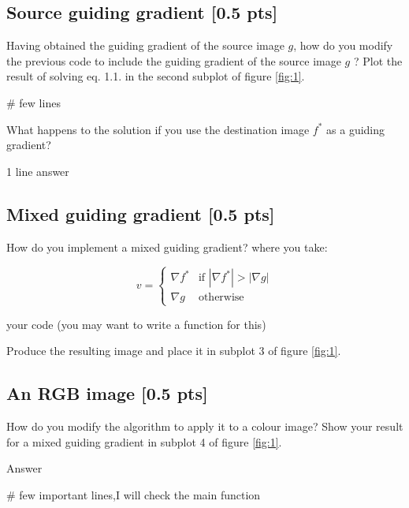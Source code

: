 \documentclass[paper=a4, fontsize=12pt]{scrartcl} %
\numberwithin{equation}{section}       %
\numberwithin{figure}{section}         %
\numberwithin{table}{section}          %
\begin{document}
\subsection{Source guiding gradient [0.5 pts]}
Having obtained the guiding gradient of the source image $g$, how do you modify the previous code to include the guiding gradient of the source image $g$ ? Plot the result  of solving eq. 1.1. in the second subplot of figure \ref{fig:1}.

 \begin{tcolorbox}
\begin{python}
# few lines
\end{python}
 \end{tcolorbox}
 
 What happens to the solution if you use the destination image $f^*$ as a  guiding gradient?
  \begin{tcolorbox}
1 line answer
 \end{tcolorbox}
 
 
 
 \subsection{Mixed guiding gradient [0.5 pts]}
How do you implement a mixed guiding gradient? where you take:

\begin{equation}
v=
\begin{cases}
\nabla f^* & \text{if } |\nabla f^*|>|\nabla g|\\
\nabla g& \text{otherwise}
\end{cases}
\end{equation}


 \begin{tcolorbox}
\begin{python}
your code (you may want to write a function for this)
\end{python}
 \end{tcolorbox}
 
 Produce the resulting image and place it in subplot 3 of figure \ref{fig:1}. 
  
 \subsection{An RGB image [0.5 pts]}
 How do you modify the algorithm to apply it to a colour image?
Show your result for a mixed guiding gradient in subplot 4 of figure \ref{fig:1}.

 \begin{tcolorbox}
Answer
\begin{python}
# few important lines,I will check the main function
\end{python}
 \end{tcolorbox}
\end{document}
